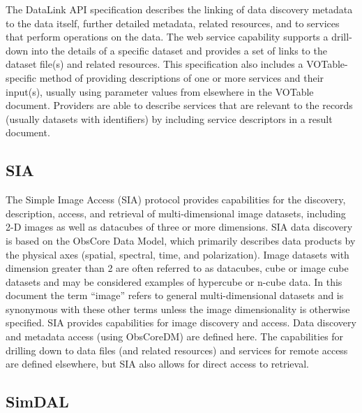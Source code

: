 \documentclass[11pt,letter]{ivoa}
\begin{document}
The DataLink \citep{2023ivoa.spec.1215B} API specification describes the
linking of data discovery metadata to
the data itself, further detailed metadata, related resources, and to
services that perform
operations on the data. The web service capability supports a drill-down
into the details
of a specific dataset and provides a set of links to the dataset file(s)
and related resources.
This specification also includes a VOTable-specific method of providing
descriptions of one
or more services and their input(s), usually using parameter values from
elsewhere in the
VOTable document. Providers are able to describe services that are
relevant to the records
(usually datasets with identifiers) by including service descriptors in
a result document.

\subsection{SIA}

The Simple Image Access (SIA) \citep{2015ivoa.spec.1223D} protocol
provides capabilities for the discovery, description,
access, and retrieval of multi-dimensional image datasets, including 2-D
images as well
as datacubes of three or more dimensions. SIA data discovery is based on
the ObsCore Data
Model, which primarily describes data products by the physical axes
(spatial, spectral,
time, and polarization). Image datasets with dimension greater than 2
are often referred
to as datacubes, cube or image cube datasets and may be considered
examples of hypercube
or n-cube data. In this document the term ``image'' refers to general
multi-dimensional
datasets and is synonymous with these other terms unless the image
dimensionality is
otherwise specified. SIA provides capabilities for image discovery and
access. Data
discovery and metadata access (using ObsCoreDM) are defined here. The
capabilities for
drilling down to data files (and related resources) and services for
remote access are
defined elsewhere, but SIA also allows for direct access to retrieval. 

\subsection{SimDAL}
\end{document}
